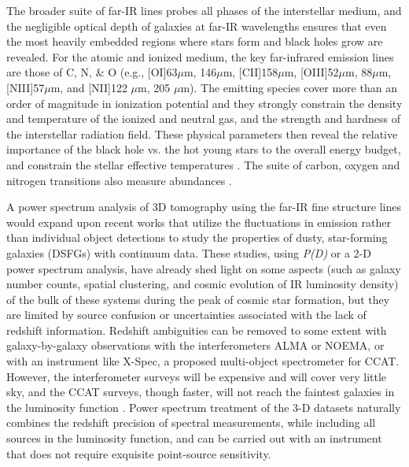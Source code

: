 \documentclass[iop,twocolappendix]{emulateapj}
\begin{document}
The broader suite of far-IR lines probes all phases of the interstellar medium, and the negligible optical depth of galaxies at far-IR wavelengths ensures that even the most heavily embedded regions where stars form and black holes grow are revealed. For the atomic and ionized medium, the key far-infrared emission lines are those of C, N, \& O (e.g., [OI]63$\mu$m, 146$\mu$m, [CII]158$\mu$m, [OIII]52$\mu$m, 88$\mu$m, [NIII]57$\mu$m, and [NII]122 $\mu$m, 205 $\mu$m). The emitting species cover more than an order of magnitude in ionization potential and they strongly constrain the density and temperature of the ionized and neutral gas, and the strength and hardness of the interstellar radiation field.  These physical parameters then reveal the relative importance of the black hole vs. the hot young stars to the overall energy budget, and constrain the stellar effective temperatures \cite[e.g.]{rubin85,dale04,colbertM82,malhotra01,ferkinhoff11,lebouteiller12}. The suite of carbon, oxygen and nitrogen transitions also measure abundances \citep{garnett04, lester87,nagao11}.

A power spectrum analysis of 3D tomography using the far-IR fine structure lines would expand upon recent works that utilize the fluctuations in emission rather than individual object detections to study the properties of dusty, star-forming galaxies (DSFGs) with continuum data. These studies, using \emph{P(D)} \citep{glenn10, bethermin11} or a 2-D power spectrum \citep{viero13, planckXXX} analysis, have already shed light on some aspects (such as galaxy number counts, spatial clustering, and cosmic evolution of IR luminosity density) of the bulk of these systems during the peak of cosmic star formation, but they are limited by source confusion or uncertainties associated with the lack of redshift information. Redshift ambiguities can be removed to some extent with galaxy-by-galaxy observations with the interferometers ALMA or NOEMA, or with an instrument like X-Spec, a proposed multi-object spectrometer for CCAT. However, the interferometer surveys will be expensive and will cover very little sky, and the CCAT surveys, though faster, will not reach the faintest galaxies in the luminosity function \citep{bradford09ccat}. Power spectrum treatment of the 3-D datasets naturally combines the redshift precision of spectral measurements, while including all sources in the luminosity function, and can be carried out with an instrument that does not require exquisite point-source sensitivity. 
\end{document}
